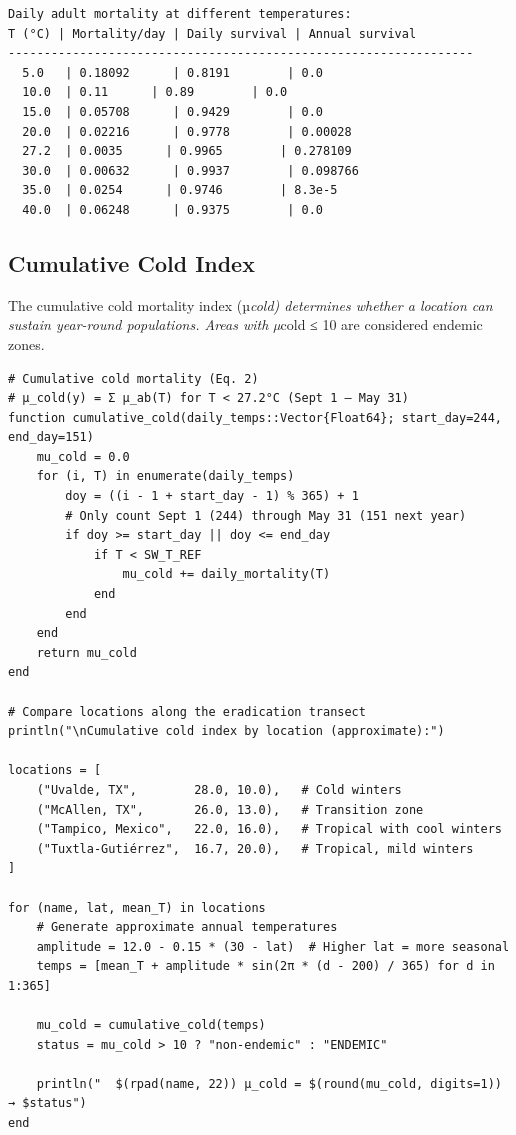 \begin{verbatim}
Daily adult mortality at different temperatures:
T (°C) | Mortality/day | Daily survival | Annual survival
-----------------------------------------------------------------
  5.0   | 0.18092      | 0.8191        | 0.0
  10.0  | 0.11      | 0.89        | 0.0
  15.0  | 0.05708      | 0.9429        | 0.0
  20.0  | 0.02216      | 0.9778        | 0.00028
  27.2  | 0.0035      | 0.9965        | 0.278109
  30.0  | 0.00632      | 0.9937        | 0.098766
  35.0  | 0.0254      | 0.9746        | 8.3e-5
  40.0  | 0.06248      | 0.9375        | 0.0
\end{verbatim}



\subsection{Cumulative Cold Index}



\label{2102736385556110340}{}


The cumulative cold mortality index (µ\emph{cold) determines whether a location can sustain year-round populations. Areas with µ}cold ≤ 10 are considered endemic zones.




\begin{verbatim}
# Cumulative cold mortality (Eq. 2)
# µ_cold(y) = Σ µ_ab(T) for T < 27.2°C (Sept 1 – May 31)
function cumulative_cold(daily_temps::Vector{Float64}; start_day=244, end_day=151)
    mu_cold = 0.0
    for (i, T) in enumerate(daily_temps)
        doy = ((i - 1 + start_day - 1) % 365) + 1
        # Only count Sept 1 (244) through May 31 (151 next year)
        if doy >= start_day || doy <= end_day
            if T < SW_T_REF
                mu_cold += daily_mortality(T)
            end
        end
    end
    return mu_cold
end

# Compare locations along the eradication transect
println("\nCumulative cold index by location (approximate):")

locations = [
    ("Uvalde, TX",        28.0, 10.0),   # Cold winters
    ("McAllen, TX",       26.0, 13.0),   # Transition zone
    ("Tampico, Mexico",   22.0, 16.0),   # Tropical with cool winters
    ("Tuxtla-Gutiérrez",  16.7, 20.0),   # Tropical, mild winters
]

for (name, lat, mean_T) in locations
    # Generate approximate annual temperatures
    amplitude = 12.0 - 0.15 * (30 - lat)  # Higher lat = more seasonal
    temps = [mean_T + amplitude * sin(2π * (d - 200) / 365) for d in 1:365]

    mu_cold = cumulative_cold(temps)
    status = mu_cold > 10 ? "non-endemic" : "ENDEMIC"

    println("  $(rpad(name, 22)) µ_cold = $(round(mu_cold, digits=1))  → $status")
end
\end{verbatim}





